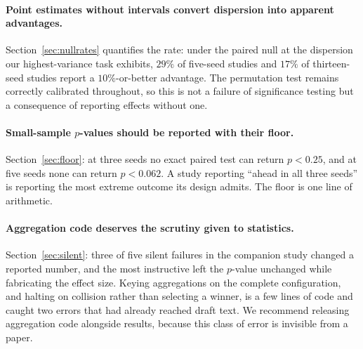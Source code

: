 \documentclass[11pt,onecolumn]{article}
\begin{document}
\paragraph{Point estimates without intervals convert dispersion into
apparent advantages.}
Section~\ref{sec:nullrates} quantifies the rate: under the paired null
at the dispersion our highest-variance task exhibits, $29\%$ of
five-seed studies and $17\%$ of thirteen-seed studies report a
$10\%$-or-better advantage. The permutation test remains correctly
calibrated throughout, so this is not a failure of significance testing
but a consequence of reporting effects without one.

\paragraph{Small-sample $p$-values should be reported with their floor.}
Section~\ref{sec:floor}: at three seeds no exact paired test can return
$p < 0.25$, and at five seeds none can return $p < 0.062$. A study
reporting ``ahead in all three seeds'' is reporting the most extreme
outcome its design admits. The floor is one line of arithmetic.

\paragraph{Aggregation code deserves the scrutiny given to statistics.}
Section~\ref{sec:silent}: three of five silent failures in the companion
study changed a reported number, and the most instructive left the
$p$-value unchanged while fabricating the effect size. Keying
aggregations on the complete configuration, and halting on collision
rather than selecting a winner, is a few lines of code and caught two
errors that had already reached draft text. We recommend releasing
aggregation code alongside results, because this class of error is
invisible from a paper.

\end{document}
